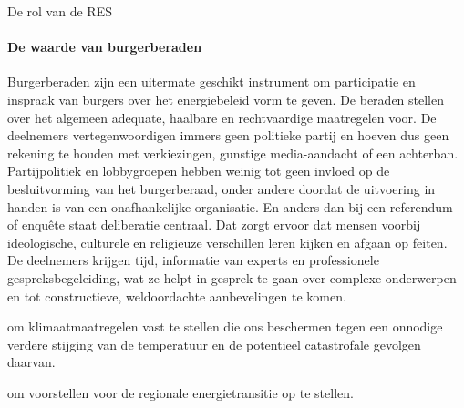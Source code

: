 \begin{voorstel}{De rol van de RES}
\begin{multicols*}{2}
\begin{overwegingen}

\paragraph{De waarde van burgerberaden}
Burgerberaden zijn een uitermate geschikt instrument om participatie en inspraak van burgers over het energiebeleid vorm te geven.
De beraden stellen over het algemeen adequate, haalbare en rechtvaardige maatregelen voor. De deelnemers vertegenwoordigen immers geen politieke partij en hoeven dus geen rekening te houden met verkiezingen, gunstige media-aandacht of een achterban. Partijpolitiek en lobbygroepen hebben weinig tot geen invloed op de besluitvorming van het burgerberaad, onder andere doordat de uitvoering in handen is van een onafhankelijke organisatie. En anders dan bij een referendum of enquête staat deliberatie centraal. Dat zorgt ervoor dat mensen voorbij ideologische, culturele en religieuze verschillen leren kijken en afgaan op feiten. De deelnemers krijgen tijd, informatie van experts en professionele gespreksbegeleiding, wat ze helpt in gesprek te gaan over complexe onderwerpen en tot constructieve, weldoordachte aanbevelingen te komen.


\end{overwegingen}

\begin{aanbevelingen}
 om klimaatmaatregelen vast te stellen die ons beschermen tegen een onnodige verdere stijging van de temperatuur en de potentieel catastrofale gevolgen daarvan.

 om voorstellen voor de regionale energietransitie op te stellen.

\end{aanbevelingen}

\end{multicols*}

\end{voorstel}
